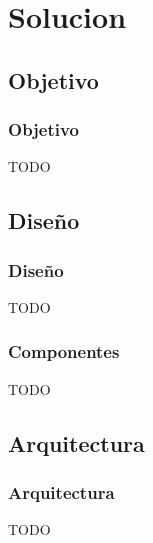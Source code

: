 \section{Solucion}
\subsection{Objetivo}
\begin{frame}[shrink]
  \frametitle{Objetivo}
  TODO
\end{frame}

\subsection{Diseño}
\begin{frame}[shrink]
  \frametitle{Diseño}
  TODO
\end{frame}

\begin{frame}[shrink]
  \frametitle{Componentes}
  TODO
\end{frame}

\subsection{Arquitectura}
\begin{frame}[shrink]
  \frametitle{Arquitectura}
  TODO
\end{frame}

